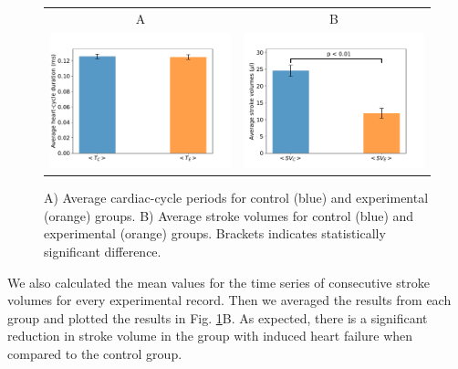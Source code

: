 \documentclass[%
preprint,
 amsmath,amssymb,
 aps,
]{revtex4-2}
\begin{document}
\begin{figure}[h!]
    \begin{tabular}{cc}
        A & B \\
        \includegraphics[width=3in]{Fig01_A.pdf} &
        \includegraphics[width=3in]{Fig01_B.pdf}
    \end{tabular}
    \caption{A) Average cardiac-cycle periods for control (blue) and experimental (orange) groups. B) Average stroke volumes for control (blue) and experimental (orange) groups. Brackets indicates statistically significant difference.}
    \label{fig:fig01}
\end{figure}

We also calculated the mean values for the time series of consecutive stroke volumes for every experimental record. Then we averaged the results from each group and plotted the results in Fig. \ref{fig:fig01}B. As expected, there is a significant reduction in stroke volume in the group with induced heart failure when compared to the control group.
\end{document}
